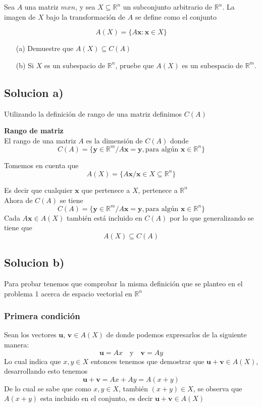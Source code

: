 Sea $A$ una matriz $mxn$, y sea $X \subseteq \mathbb{R}^n$ un subconjunto arbitrario de $\mathbb{R}^n$. La imagen de $X$ bajo la transformación de $A$ se define como el conjunto

$$
A(X) = \{ A \mathbf{x} : \mathbf{x} \in X \}
$$

\begin{itemize}
    \item[(a)] Demuestre que $A(X) \subseteq C(A)$

    \item[(b)] Si $X$ es un subespacio de $\mathbb{R}^n$, pruebe que $A(X)$ es un subespacio de $\mathbb{R}^m$.
\end{itemize}

\subsection{Solucion a)}
Utilizando la definición de rango de una matriz definimos $C(A)$
\begin{defi}\textbf{Rango de matriz}
    \\
    El rango de una matriz $A$ es la dimensión de $C(A)$ donde
    $$
    C(A) = \{ \mathbf{y} \in \mathbb{R}^m / A\mathbf{x} = \mathbf{y}, \text{para algún }\mathbf{x} \in \mathbb{R}^n \}
    $$
\end{defi}

Tomemos en cuenta que 
$$
A(X) = \{ A \mathbf{x} / \mathbf{x} \in X \subseteq \mathbb{R}^n \}
$$

Es decir que cualquier $\mathbf{x}$ que pertenece a $X$, pertenece a $\mathbb{R}^n$ \\

Ahora de $C(A)$ se tiene
$$
C(A) = \{ \mathbf{y} \in \mathbb{R}^m / A \mathbf{x} = \mathbf{y}, \text{para algún }\mathbf{x} \in \mathbb{R}^n \}
$$
Cada $A\mathbf{x} \in A(X)$ también está incluido en $C(A)$ por lo que generalizando se tiene que
$$
A(X) \subseteq C(A)
$$

\subsection{Solucion b)}
Para probar tenemos que comprobar la misma definición que se planteo en el problema 1 acerca de espacio vectorial en $\mathbb{R}^n$

\subsubsection{Primera condición}
Sean los vectores $\mathbf{u}$, $\mathbf{v} \in A(X)$ de donde podemos expresarlos de la siguiente manera:
$$
\mathbf{u} = Ax \quad \text{y} \quad \mathbf{v} = Ay
$$
Lo cual indica que $x,y \in X$ entonces tenemos que demostrar que $\mathbf{u}+\mathbf{v} \in A(X)$, desarrollando esto tenemos
$$
\mathbf{u} + \mathbf{v} = Ax + Ay = A(x+y)
$$
De lo cual se sabe que como $x, y \in X$, también $(x+y) \in X$, se observa que $A(x+y)$ esta incluido en el conjunto, es decir $\mathbf{u} + \mathbf{v} \in A(X)$

